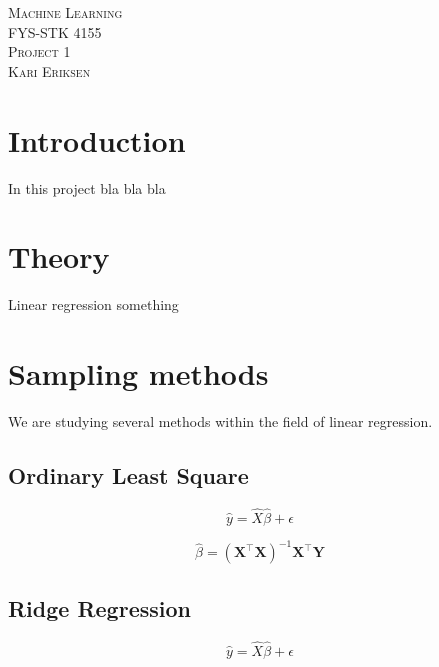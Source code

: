 \documentclass[a4paper,12pt, english]{article}
\begin{document}
\begin{titlepage}
\begin{center}
\textsc{\Large Machine Learning}\\[0.2cm]
\textsc{FYS-STK 4155}\\[1.0cm]
\textsc{\Large Project 1}\\[0.5cm]
\textsc{Kari Eriksen}\\[0.5cm]

\end{center}
\end{titlepage}

\section*{Introduction}

In this project bla bla bla

\section*{Theory}

Linear regression something

\section*{Sampling methods}

We are studying several methods within the field of linear regression.

\subsection*{Ordinary Least Square}

\begin{equation}
\hat{y} = \hat{X} \hat{\beta} + \epsilon
\end{equation}

\begin{equation}
\hat{\beta} = (\mathbf{X}^{\top}\mathbf{X})^{-1}\mathbf{X}^{\top}\mathbf{Y}
\end{equation}

\subsection*{Ridge Regression}

\begin{equation}
\hat{y} = \hat{X} \hat{\beta} + \epsilon
\end{equation}
\end{document}
